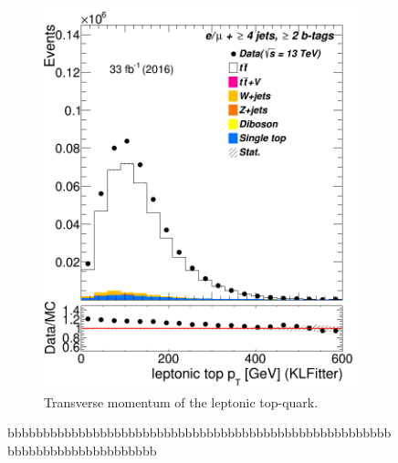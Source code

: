 \begin{figure}
\begin{subfigure}{0.35\textwidth}
		\includegraphics[width=\linewidth]{ControlPlots_emujets_2016_4incl_2incl/klf_topLep_pt_emujets_2016.png}
		\caption{Transverse momentum of the leptonic top-quark.} \label{fig:28}
	\end{subfigure}	
	\caption{bbbbbbbbbbbbbbbbbbbbbbbbbbbbbbbbbbbbbbbbbbbbbbbbbbbbbbbbbbbbbbbbbbbbbbbbbbb}
\end{figure}	


